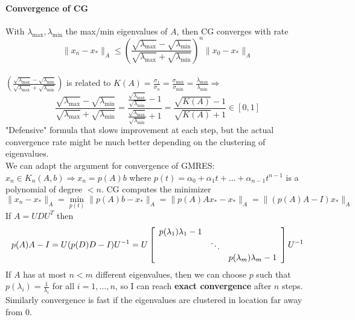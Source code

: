 \documentclass[10pt]{report}
\begin{document}
\paragraph{Convergence of CG} With $\lambda_{\max},\lambda_{\min}$ the max/min eigenvalues of $A$, then CG converges with rate $$\|x_n-x_*\|_A\leq \left(\frac{\sqrt{\lambda_{\max}}-\sqrt{\lambda_{\min}}}{\sqrt{\lambda_{\max}}+\sqrt{\lambda_{\min}}}\right)^n\|x_0-x_*\|_A$$\\
$\left(\frac{\sqrt{\lambda_{\max}}-\sqrt{\lambda_{\min}}}{\sqrt{\lambda_{\max}}+\sqrt{\lambda_{\min}}}\right)$ is related to $K(A) = \frac{\sigma_1}{\sigma_n} = \frac{\sigma_{\max}}{\sigma_{\min}}=\frac{\lambda_{\max}}{\lambda_{\min}} \Rightarrow$ $$\frac{\sqrt{\lambda_{\max}}-\sqrt{\lambda_{\min}}}{\sqrt{\lambda_{\max}}+\sqrt{\lambda_{\min}}} = \frac{\frac{\sqrt{\lambda_{\max}}}{\sqrt{\lambda_{\min}}} - 1}{\frac{\sqrt{\lambda_{\max}}}{\sqrt{\lambda_{\min}}} + 1} = \frac{\sqrt{K(A)}-1}{\sqrt{K(A)}+1}\in [0,1]$$
"Defensive" formula that slows improvement at each step, but the actual convergence rate might be much better depending on the clustering of eigenvalues.\\
We can adapt the argument for convergence of GMRES: $x_n\in K_n(A,b) \Rightarrow x_n = p(A)b$ where $p(t) = \alpha_0 + \alpha_1t + \ldots + \alpha_{n-1}t^{n-1}$ is a polynomial of degree $<n$. CG computes the minimizer $$\|x_n-x_*\|_A = \min_{p(t)}\|p(A)b - x_*\|_A = \|p(A)Ax_*-x_*\|_A = \|(p(A)A-I)x_*\|_A$$
If $A =UDU^T$ then $$p(A)A-I = U(p(D)D-I)U^{-1} = U\left[\begin{array}{c c c}
p(\lambda_1)\lambda_1-1\\
& \ddots \\
& & p(\lambda_m)\lambda_m - 1
\end{array}\right]U^{-1}$$
If $A$ has at most $n<m$ different eigenvalues, then we can choose $p$ such that $p(\lambda_i)=\frac{1}{\lambda_i}$ for all $i=1,\ldots,n$, so I can reach \textbf{exact convergence} after $n$ steps.\\
Similarly convergence is fast if the eigenvalues are clustered in location far away from 0.
\end{document}
